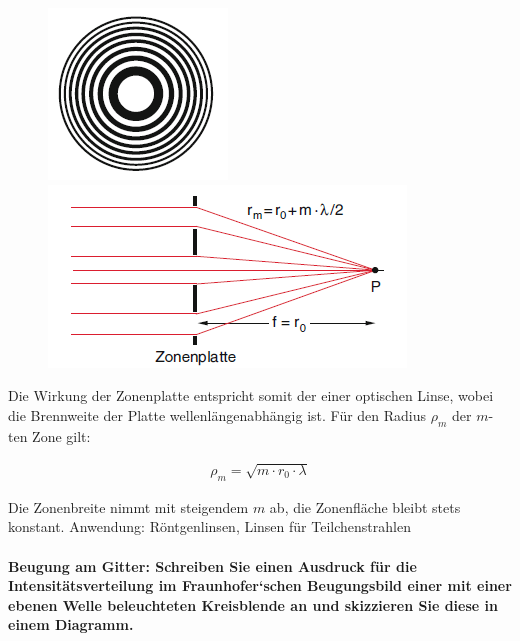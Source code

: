 \documentclass[a4paper, 11pt, ngerman, parskip=half-]{scrartcl}
\newcommand{\myparagraph}[1]{\paragraph{#1}\mbox{}\\}
\begin{document}
\begin{figure}[H]
    \begin{minipage}{.47\textwidth}
        \centering
        \includegraphics[width=0.5\linewidth]{image/19/5.1}

    \end{minipage}%
    \hfill%
    \begin{minipage}{.47\textwidth}
        \centering
        \includegraphics[width=0.92\linewidth]{image/19/5.2}
    \end{minipage}
\end{figure}

Die Wirkung der Zonenplatte entspricht somit der einer optischen Linse, wobei die Brennweite der Platte wellenlängenabhängig
ist. Für den Radius $\rho_m$ der $m$-ten Zone gilt:

\begin{align*}
    \rho_m = \sqrt{m \cdot r_0 \cdot \lambda}
\end{align*}

Die Zonenbreite nimmt mit steigendem $m$ ab, die Zonenfläche bleibt stets konstant.
Anwendung: Röntgenlinsen, Linsen für Teilchenstrahlen

\myparagraph{Beugung am Gitter: Schreiben Sie einen Ausdruck für die Intensitätsverteilung im
    Fraunhofer‘schen Beugungsbild einer mit einer ebenen Welle beleuchteten Kreisblende an
    und skizzieren Sie diese in einem Diagramm.}
\end{document}
